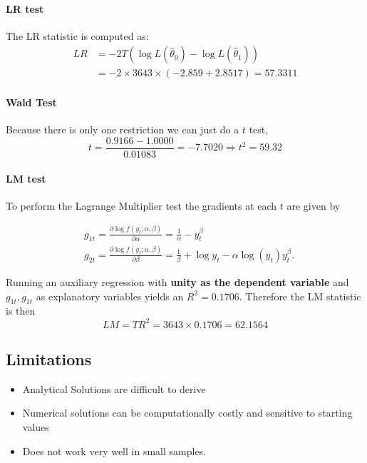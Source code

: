 \documentclass[11pt]{article}
\begin{document}
\paragraph{LR test} \mbox{}
The LR statistic is computed as:
\begin{equation}
\begin{aligned}
L R & =-2 T\left(\log L\left(\widehat{\theta}_0\right)-\log L\left(\widehat{\theta}_1\right)\right) \\
& =-2 \times 3643 \times(-2.859+2.8517)=57.3311
\end{aligned}
\end{equation}

\paragraph{Wald Test} \mbox{}
Because there is only one restriction we can just do a $t$ test,
\begin{equation}
t=\frac{0.9166-1.0000}{0.01083}=-7.7020 \Rightarrow t^2=59.32
\end{equation}

\paragraph{LM test} \mbox{}

To perform the Lagrange Multiplier test the gradients at each $t$ are given by

\begin{equation}
\begin{aligned}
& g_{1 t}=\frac{\partial \log f\left(y_t ; \alpha, \beta\right)}{\partial \alpha}=\frac{1}{\alpha}-y_t^\beta \\
& g_{2 t}=\frac{\partial \log f\left(y_t ; \alpha, \beta\right)}{\partial \beta}=\frac{1}{\beta}+\log y_t-\alpha \log \left(y_t\right) y_t^\beta .
\end{aligned}
\end{equation}

Running an auxiliary regression with \textbf{unity as the dependent variable} and $g_{1t}, g_{1t}$ as explanatory variables yields an $R^2=0.1706$. Therefore the LM statistic is then
\[LM = TR^2 = 3643\times 0.1706 = 62.1564\]



\begin{shaded}
    \subsection{Limitations}
    \begin{itemize}
        \item Analytical Solutions are difficult to derive
        \item Numerical solutions can be computationally costly and sensitive to starting values
        \item Does not work very well in small samples.
    \end{itemize}
\end{shaded}
\end{document}
